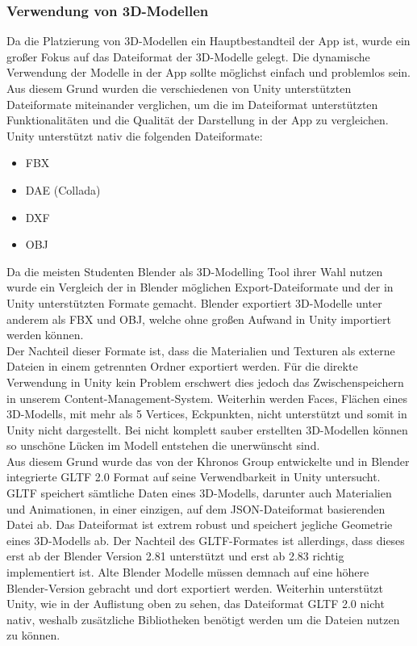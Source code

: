 \documentclass[titlepage, a4paper, 11pt]{scrartcl}
\begin{document}
  \subsubsection{Verwendung von 3D-Modellen}
  Da die Platzierung von 3D-Modellen ein Hauptbestandteil der App ist, wurde ein großer Fokus auf das Dateiformat der 3D-Modelle gelegt. Die dynamische Verwendung der Modelle in der App sollte möglichst einfach und problemlos sein.\\ 
  Aus diesem Grund wurden die verschiedenen von Unity unterstützten Dateiformate miteinander verglichen, um die im Dateiformat unterstützten Funktionalitäten und die Qualität der Darstellung in der App zu vergleichen.\\
  Unity unterstützt nativ die folgenden Dateiformate:
  \begin{itemize}
  \item FBX
  \item DAE (Collada)
  \item DXF
  \item OBJ
  \end{itemize}
  Da die meisten Studenten Blender als 3D-Modelling Tool ihrer Wahl nutzen wurde ein Vergleich der in Blender möglichen Export-Dateiformate und der in Unity unterstützten Formate gemacht. Blender exportiert 3D-Modelle unter anderem als FBX und OBJ, welche ohne großen Aufwand in Unity importiert werden können.\\
  Der Nachteil dieser Formate ist, dass die Materialien und Texturen als externe Dateien in einem getrennten Ordner exportiert werden. Für die direkte Verwendung in Unity kein Problem erschwert dies jedoch das Zwischenspeichern in unserem Content-Management-System. Weiterhin werden \glqq Faces\grqq, Flächen eines 3D-Modells, mit mehr als 5 \glqq Vertices\grqq, Eckpunkten, nicht unterstützt und somit in Unity nicht dargestellt. Bei nicht komplett sauber erstellten 3D-Modellen können so unschöne Lücken im Modell entstehen die unerwünscht sind.\\
  Aus diesem Grund wurde das von der Khronos Group entwickelte und in Blender integrierte GLTF 2.0 Format auf seine Verwendbarkeit in Unity untersucht. GLTF speichert sämtliche Daten eines 3D-Modells, darunter auch Materialien und Animationen, in einer einzigen, auf dem JSON-Dateiformat basierenden Datei ab. Das Dateiformat ist extrem robust und speichert jegliche Geometrie eines 3D-Modells ab. Der Nachteil des GLTF-Formates ist allerdings, dass dieses erst ab der Blender Version 2.81 unterstützt und erst ab 2.83 richtig implementiert ist. Alte Blender Modelle müssen demnach auf eine höhere Blender-Version gebracht und dort exportiert werden. Weiterhin unterstützt Unity, wie in der Auflistung oben zu sehen, das Dateiformat GLTF 2.0 nicht nativ, weshalb zusätzliche Bibliotheken benötigt werden um die Dateien nutzen zu können.\\
\end{document}

